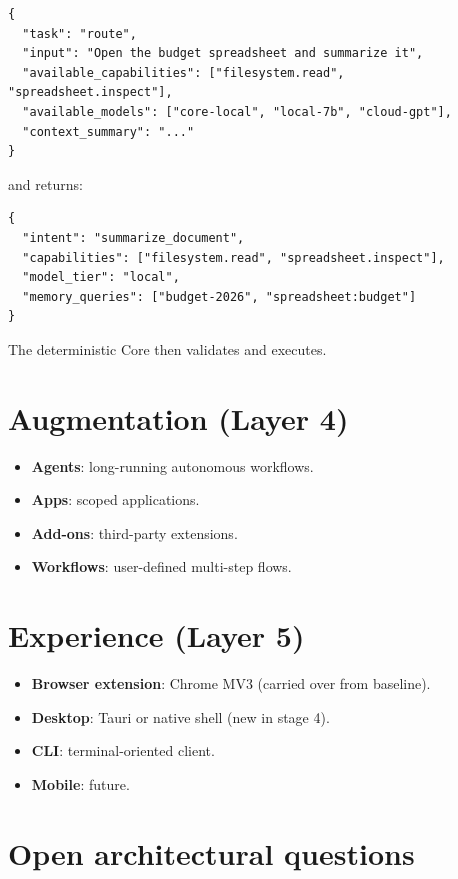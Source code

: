 \begin{lstlisting}[language=rccosjson,caption={Example request to the Cognitive Core.}]
{
  "task": "route",
  "input": "Open the budget spreadsheet and summarize it",
  "available_capabilities": ["filesystem.read", "spreadsheet.inspect"],
  "available_models": ["core-local", "local-7b", "cloud-gpt"],
  "context_summary": "..."
}
\end{lstlisting}

and returns:

\begin{lstlisting}[language=rccosjson,caption={Example response from the Cognitive Core.}]
{
  "intent": "summarize_document",
  "capabilities": ["filesystem.read", "spreadsheet.inspect"],
  "model_tier": "local",
  "memory_queries": ["budget-2026", "spreadsheet:budget"]
}
\end{lstlisting}

The deterministic Core then validates and executes.

\section{Augmentation (Layer 4)}

\begin{itemize}
  \item \textbf{Agents}: long-running autonomous workflows.
  \item \textbf{Apps}: scoped applications.
  \item \textbf{Add-ons}: third-party extensions.
  \item \textbf{Workflows}: user-defined multi-step flows.
\end{itemize}

\section{Experience (Layer 5)}

\begin{itemize}
  \item \textbf{Browser extension}: Chrome MV3 (carried over from baseline).
  \item \textbf{Desktop}: Tauri or native shell (new in stage 4).
  \item \textbf{CLI}: terminal-oriented client.
  \item \textbf{Mobile}: future.
\end{itemize}

\section{Open architectural questions}

